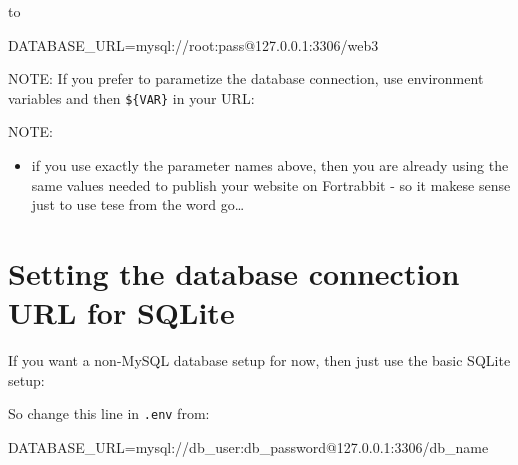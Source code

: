 \documentclass[a4paperpaper,openright]{book}
\newenvironment{Shaded}{}{}
\newcommand{\ExtensionTok}[1]{#1}
\newcommand{\NormalTok}[1]{#1}
\newcommand{\VariableTok}[1]{\textcolor[rgb]{0.10,0.09,0.49}{#1}}
\providecommand{\tightlist}{%
  \setlength{\itemsep}{0pt}\setlength{\parskip}{0pt}}
\begin{document}
to

\begin{Shaded}
\begin{Highlighting}[]
    \VariableTok{DATABASE_URL=}\NormalTok{mysql://root:pass}\ExtensionTok{@127.0.0.1}\NormalTok{:3306/web3}
\end{Highlighting}
\end{Shaded}

NOTE: If you prefer to parametize the database connection, use
environment variables and then \texttt{\$\{VAR\}} in your URL:

\begin{Shaded}
\end{Shaded}

NOTE:

\begin{itemize}
\tightlist
\item
  if you use exactly the parameter names above, then you are already
  using the same values needed to publish your website on Fortrabbit -
  so it makese sense just to use tese from the word go\ldots{}
\end{itemize}

\hypertarget{setting-the-database-connection-url-for-sqlite}{%
\section{Setting the database connection URL for
SQLite}\label{setting-the-database-connection-url-for-sqlite}}

If you want a non-MySQL database setup for now, then just use the basic
SQLite setup:

So change this line in \texttt{.env} from:

\begin{Shaded}
\begin{Highlighting}[]
    \VariableTok{DATABASE_URL=}\NormalTok{mysql://db_user:db_password}\ExtensionTok{@127.0.0.1}\NormalTok{:3306/db_name}
\end{Highlighting}
\end{Shaded}
\end{document}
